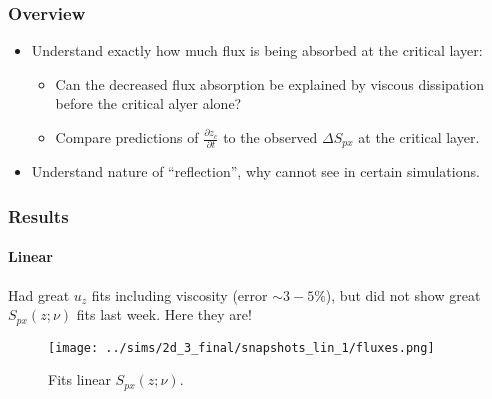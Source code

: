 \documentclass[dvipsnames]{beamer}
\newcommand*{\pd}[2]{\frac{\partial#1}{\partial#2}}
\begin{document}
\begin{frame}
    \frametitle{Overview}

    \begin{itemize}
        \item Understand exactly how much flux is being absorbed at the critical
            layer:
            \begin{itemize}
                \item Can the decreased flux absorption be explained by
                    viscous dissipation before the critical alyer alone?

                \item Compare predictions of $\pd{z_c}{t}$ to the observed
                    $\Delta S_{px}$ at the critical layer.
            \end{itemize}

        \item Understand nature of ``reflection'', why cannot see in certain
            simulations.
    \end{itemize}
\end{frame}

\begin{frame}
    \frametitle{Results}
    \framesubtitle{Linear}

    Had great $u_z$ fits including viscosity (error $\sim 3-5\%$), but did not
    show great $S_{px}(z; \nu)$ fits last week. Here they are!
    \begin{figure}[t]
        \centering
        \texttt{[image: ../sims/2d\_3\_final/snapshots\_lin\_1/fluxes.png]}
        \caption{Fits linear $S_{px}(z; \nu)$.}
    \end{figure}
\end{frame}
\end{document}
